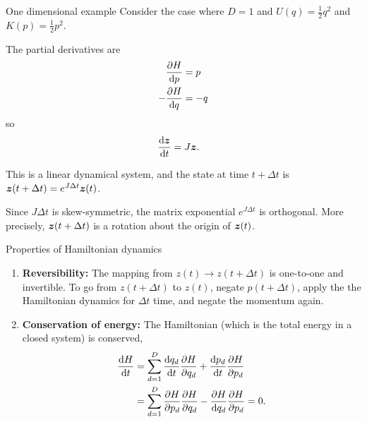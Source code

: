 \documentclass[aspectratio=169]{beamer}
\begin{document}
\begin{frame}{One dimensional example}
    Consider the case where $D=1$ and $U(q) = \tfrac{1}{2}q^2$ and $K(p) = \tfrac{1}{2}p^2$.
    
    The partial derivatives are 
    \begin{align}
        \frac{\partial H}{\mathop{}\!\mathrm{d} p} &= p \\
        -\frac{\partial H}{\mathop{}\!\mathrm{d} q} &= -q
    \end{align}
    so 
    \begin{align}
        \frac{\mathop{}\!\mathrm{d} \boldsymbol{z}}{\mathop{}\!\mathrm{d} t} &= J \boldsymbol{z}.
    \end{align}
    
    This is a linear dynamical system, and the state at time $t+\Delta t$ is $\boldsymbol{z}(t+ \Delta t) = e^{J\Delta t} \boldsymbol{z}(t)$.
    
    Since $J \Delta t$ is skew-symmetric, the matrix exponential $e^{J \Delta t}$ is orthogonal. More precisely, $\boldsymbol{z}(t + \Delta t)$ is a rotation about the origin of $\boldsymbol{z}(t)$.
    
\end{frame}

\begin{frame}{Properties of Hamiltonian dynamics}

\begin{enumerate}
    \item \textbf{Reversibility: } The mapping from $z(t) \to z(t+ \Delta t)$ is one-to-one and invertible. To go from $z(t + \Delta t)$ to $z(t)$, negate $p(t + \Delta t)$, apply the the Hamiltonian dynamics for $\Delta t$ time, and negate the momentum again.
    
    \item \textbf{Conservation of energy: } The Hamiltonian (which is the total energy in a closed system) is conserved,
    \begin{align}
        \frac{\mathop{}\!\mathrm{d} H}{\mathop{}\!\mathrm{d} t} &= \sum_{d=1}^D \frac{\mathop{}\!\mathrm{d} q_d}{\mathop{}\!\mathrm{d} t} \frac{\partial H}{\partial q_d} + \frac{\mathop{}\!\mathrm{d} p_d}{\mathop{}\!\mathrm{d} t} \frac{\partial H}{\partial p_d} \\
        &= \sum_{d=1}^D \frac{\partial H}{\partial p_d} \frac{\partial H}{\partial q_d} - \frac{\partial H}{\mathop{}\!\mathrm{d} q_d} \frac{\partial H}{\partial p_d} = 0.
    \end{align}
    
    
\end{enumerate}
    
\end{frame}
\end{document}
